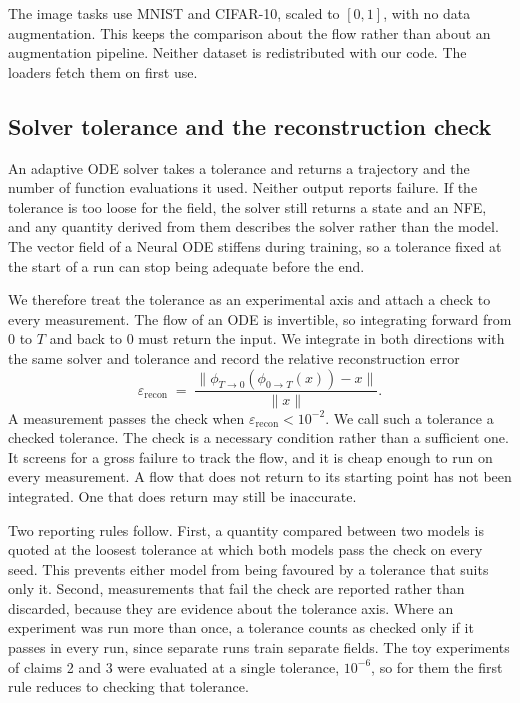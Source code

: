 The image tasks use MNIST and CIFAR-10, scaled to $[0,1]$, with no data augmentation. This
keeps the comparison about the flow rather than about an augmentation pipeline. Neither
dataset is redistributed with our code. The loaders fetch them on first use.

\subsection{Solver tolerance and the reconstruction check}
\label{sec:recon}

An adaptive ODE solver takes a tolerance and returns a trajectory and the number of function
evaluations it used. Neither output reports failure. If the tolerance is too loose for the
field, the solver still returns a state and an NFE, and any quantity derived from them
describes the solver rather than the model. The vector field of a Neural ODE stiffens during
training, so a tolerance fixed at the start of a run can stop being adequate before the end.

We therefore treat the tolerance as an experimental axis and attach a check to every
measurement. The flow of an ODE is invertible, so integrating forward from $0$ to $T$ and
back to $0$ must return the input. We integrate in both directions with the same solver and
tolerance and record the relative reconstruction error
\[
  \varepsilon_{\text{recon}}
  \;=\;
  \frac{\lVert \phi_{T\rightarrow 0}(\phi_{0\rightarrow T}(x)) - x \rVert}{\lVert x \rVert}.
\]
A measurement passes the check when $\varepsilon_{\text{recon}} < 10^{-2}$. We call such a
tolerance a checked tolerance. The check is a necessary condition rather than a sufficient
one. It screens for a gross failure to track
the flow, and it is cheap enough to run on every measurement. A flow that does not return to its
starting point has not been integrated. One that does return may still be inaccurate.

Two reporting rules follow. First, a quantity compared between two models is quoted at the loosest tolerance at which both
models pass the check on every seed. This prevents either model from being favoured by a
tolerance that suits only it. Second, measurements that fail the check are
reported rather than discarded, because they are evidence about the tolerance axis. Where an
experiment was run more than once, a tolerance counts as checked only if it passes in every
run, since separate runs train separate fields. The toy experiments of claims 2 and 3 were
evaluated at a single tolerance, $10^{-6}$, so for them the first rule reduces to checking that
tolerance.

